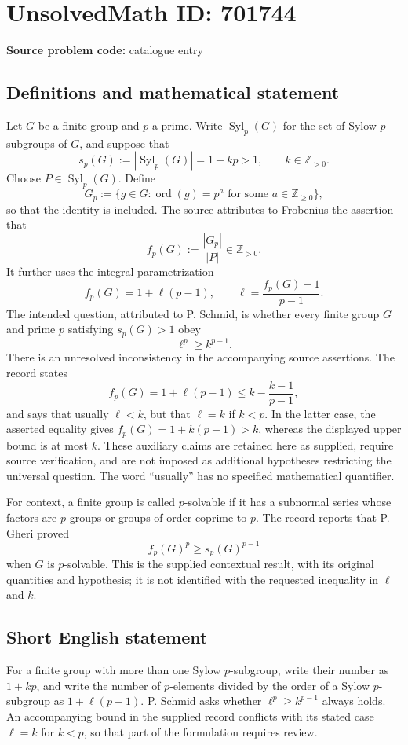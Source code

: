 \documentclass[11pt]{article}
\newcommand{\Z}{\mathbb{Z}}
\begin{document}
\section*{UnsolvedMath ID: 701744}
\textbf{Source problem code:} catalogue entry
\subsection{Definitions and mathematical statement}
Let \(G\) be a finite group and \(p\) a prime. Write \(\operatorname{Syl}_p(G)\) for the set of Sylow \(p\)-subgroups of \(G\), and suppose that
\[
s_p(G):=|\operatorname{Syl}_p(G)|=1+kp>1,
\qquad k\in\Z_{>0}.
\]
Choose \(P\in\operatorname{Syl}_p(G)\). Define
\[
G_p:=\{g\in G:\operatorname{ord}(g)=p^a\text{ for some }a\in\Z_{\ge0}\},
\]
so that the identity is included. The source attributes to Frobenius the assertion that
\[
f_p(G):=\frac{|G_p|}{|P|}\in\Z_{>0}.
\]
It further uses the integral parametrization
\[
f_p(G)=1+\ell(p-1),
\qquad \ell=\frac{f_p(G)-1}{p-1}.
\]
The intended question, attributed to P. Schmid, is whether every finite group \(G\) and prime \(p\) satisfying \(s_p(G)>1\) obey
\[
\ell^p\ge k^{p-1}.
\]
There is an unresolved inconsistency in the accompanying source assertions. The record states
\[
f_p(G)=1+\ell(p-1)\le k-\frac{k-1}{p-1},
\]
and says that usually \(\ell<k\), but that \(\ell=k\) if \(k<p\). In the latter case, the asserted equality gives \(f_p(G)=1+k(p-1)>k\), whereas the displayed upper bound is at most \(k\). These auxiliary claims are retained here as supplied, require source verification, and are not imposed as additional hypotheses restricting the universal question. The word ``usually'' has no specified mathematical quantifier.

For context, a finite group is called \(p\)-solvable if it has a subnormal series whose factors are \(p\)-groups or groups of order coprime to \(p\). The record reports that P. Gheri proved
\[
f_p(G)^p\ge s_p(G)^{p-1}
\]
when \(G\) is \(p\)-solvable. This is the supplied contextual result, with its original quantities and hypothesis; it is not identified with the requested inequality in \(\ell\) and \(k\).
\subsection{Short English statement}
For a finite group with more than one Sylow \(p\)-subgroup, write their number as \(1+kp\), and write the number of \(p\)-elements divided by the order of a Sylow \(p\)-subgroup as \(1+\ell(p-1)\). P. Schmid asks whether \(\ell^p\ge k^{p-1}\) always holds. An accompanying bound in the supplied record conflicts with its stated case \(\ell=k\) for \(k<p\), so that part of the formulation requires review.
\end{document}
